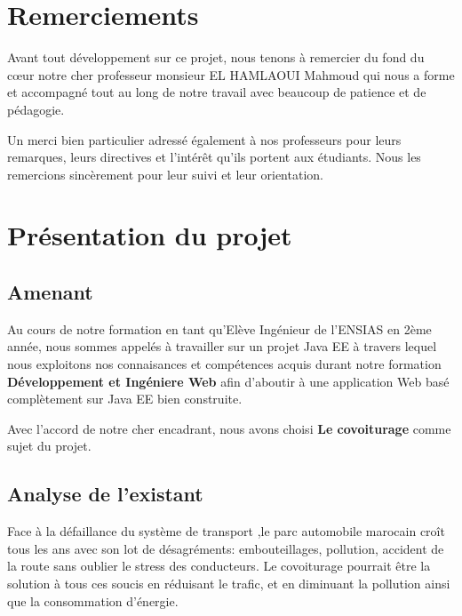 \documentclass[a4paper]{report}
\begin{document}
\tableofcontents
\thispagestyle{empty}
\setcounter{page}{0}

\newpage

\renewcommand{\arraystretch}{1}





\begin{spacing}{2}

\chapter*{Remerciements}

Avant tout développement sur ce projet, nous tenons à remercier du fond du cœur notre cher professeur monsieur EL HAMLAOUI Mahmoud qui nous a forme et accompagné  tout au long de notre travail avec beaucoup de patience et de pédagogie.

Un merci bien particulier adressé également à nos professeurs pour leurs remarques, leurs directives et l'intérêt qu'ils portent aux étudiants. Nous les remercions sincèrement pour leur suivi et leur orientation.


\chapter{Présentation du projet}
\section{Amenant}

\par 
Au cours de notre formation en tant qu'Elève Ingénieur de l'ENSIAS en 2ème année, nous sommes appelés à travailler sur un projet Java EE à travers lequel nous exploitons nos connaisances et compétences acquis durant notre formation \textbf{Développement et Ingéniere Web} afin d'aboutir à une application Web basé complètement sur Java EE bien construite. 

Avec l'accord de notre cher encadrant, nous avons choisi \textbf{Le covoiturage} comme sujet du projet. 

\section{Analyse de l'existant}

\par 
Face à la défaillance du système de transport ,le parc automobile marocain croît tous les ans avec son lot de désagréments: embouteillages, pollution, accident de la route sans oublier le stress des conducteurs. Le covoiturage pourrait être la solution à tous ces soucis en réduisant le trafic, et en diminuant la pollution ainsi que la consommation d’énergie.


\end{spacing}
\end{document}
